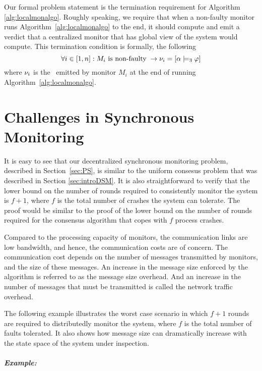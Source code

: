 Our formal problem statement is the termination requirement for Algorithm 
\ref{alg:localmonalgo}. Roughly speaking, we require that when a 
non-faulty monitor runs Algorithm~\ref{alg:localmonalgo} to the end, it should 
compute and emit a verdict that a centralized monitor that has global view of 
the system would compute. This termination condition is formally, the following
$$\forall i \in [1, n] : M_i~ \text{is non-faulty} \; \rightarrow \nu_i 
= [\alpha \models_3 \varphi]$$ 
where $\nu_i$ is the \truthvalue~emitted by monitor $M_i$ at the end of 
running Algorithm~\ref{alg:localmonalgo}.

\section{Challenges in Synchronous Monitoring}
\label{sec:challenge}

It is easy to see that our decentralized synchronous monitoring problem, 
described in Section~\ref{sec:PS}, is similar to the uniform consesus problem that was described in Section \ref{sec:introDSM}. It is also straightforward to verify that the lower bound on the number of rounds required to consistently monitor the system is $f+1$, where $f$ is the total number of crashes the system can tolerate. The proof would be similar to 
the proof of the lower bound on the number of rounds required for the consensus 
algorithm that copes with $f$ process crashes.





Compared to the processing capacity of monitors, the communication links are low 
bandwidth, and hence, the communication costs are of concern. The communication 
cost depends on the number of messages transmitted by monitors, and 
the size of these messages. An increase in the message size enforced by the 
algorithm is referred to as the message size overhead. And an increase in the 
number of messages that must be transmitted is called the network traffic 
overhead. 

The following example illustrates the worst case scenario in which $f+1$ rounds 
are required to distributedly monitor the system, where $f$ is the total number 
of faults tolerated. It also shows how message size can dramatically increase with the state space of the system under inspection. 

\subparagraph{Example:}

